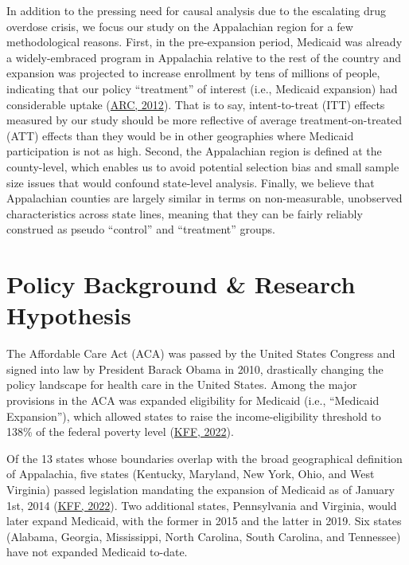 \documentclass[
  11pt,
]{article}
\begin{document}
In addition to the pressing need for causal analysis due to the
escalating drug overdose crisis, we focus our study on the Appalachian
region for a few methodological reasons. First, in the pre-expansion
period, Medicaid was already a widely-embraced program in Appalachia
relative to the rest of the country and expansion was projected to
increase enrollment by tens of millions of people, indicating that our
policy ``treatment'' of interest (i.e., Medicaid expansion) had
considerable uptake
(\href{https://www.arc.gov/wp-content/uploads/2020/06/HealthCareCostsandAccessDisparitiesinAppalachia.pdf}{ARC,
2012}). That is to say, intent-to-treat (ITT) effects measured by our
study should be more reflective of average treatment-on-treated (ATT)
effects than they would be in other geographies where Medicaid
participation is not as high. Second, the Appalachian region is defined
at the county-level, which enables us to avoid potential selection bias
and small sample size issues that would confound state-level analysis.
Finally, we believe that Appalachian counties are largely similar in
terms on non-measurable, unobserved characteristics across state lines,
meaning that they can be fairly reliably construed as pseudo ``control''
and ``treatment'' groups.

\medspace

\hypertarget{policy-background-research-hypothesis}{%
\section{Policy Background \& Research
Hypothesis}\label{policy-background-research-hypothesis}}

The Affordable Care Act (ACA) was passed by the United States Congress
and signed into law by President Barack Obama in 2010, drastically
changing the policy landscape for health care in the United States.
Among the major provisions in the ACA was expanded eligibility for
Medicaid (i.e., ``Medicaid Expansion''), which allowed states to raise
the income-eligibility threshold to 138\% of the federal poverty level
(\href{https://www.kff.org/medicaid/issue-brief/status-of-state-medicaid-expansion-decisions-interactive-map/}{KFF,
2022}).

Of the 13 states whose boundaries overlap with the broad geographical
definition of Appalachia, five states (Kentucky, Maryland, New York,
Ohio, and West Virginia) passed legislation mandating the expansion of
Medicaid as of January 1st, 2014
(\href{https://www.kff.org/medicaid/issue-brief/status-of-state-medicaid-expansion-decisions-interactive-map/}{KFF,
2022}). Two additional states, Pennsylvania and Virginia, would later
expand Medicaid, with the former in 2015 and the latter in 2019. Six
states (Alabama, Georgia, Mississippi, North Carolina, South Carolina,
and Tennessee) have not expanded Medicaid to-date.
\end{document}

